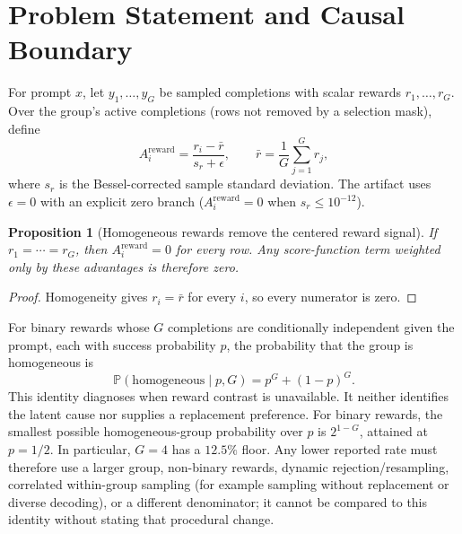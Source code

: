 \documentclass{article}
\newtheorem{proposition}{Proposition}
\newcommand{\Prob}{\mathbb{P}}
\begin{document}
\section{Problem Statement and Causal Boundary}

For prompt $x$, let $y_1,\ldots,y_G$ be sampled completions with scalar rewards
$r_1,\ldots,r_G$.  Over the group's active completions (rows not removed by a
selection mask), define
\begin{equation}
  A_i^{\mathrm{reward}}
  = \frac{r_i-\bar r}{s_r+\epsilon},
  \qquad
  \bar r=\frac{1}{G}\sum_{j=1}^G r_j,
\end{equation}
where $s_r$ is the Bessel-corrected sample standard deviation.  The artifact
uses $\epsilon=0$ with an explicit zero branch ($A_i^{\mathrm{reward}}=0$ when
$s_r\leq10^{-12}$).

\begin{proposition}[Homogeneous rewards remove the centered reward signal]
If $r_1=\cdots=r_G$, then $A_i^{\mathrm{reward}}=0$ for every row.  Any
score-function term weighted only by these advantages is therefore zero.
\end{proposition}

\begin{proof}
Homogeneity gives $r_i=\bar r$ for every $i$, so every numerator is zero.
\end{proof}

For binary rewards whose $G$ completions are conditionally independent given
the prompt, each with success probability $p$, the probability that the group
is homogeneous is
\begin{equation}
  \Prob(\text{homogeneous}\mid p,G)=p^G+(1-p)^G.
\end{equation}
This identity diagnoses when reward contrast is unavailable.  It neither
identifies the latent cause nor supplies a replacement preference.
For binary rewards, the smallest possible homogeneous-group probability over
$p$ is $2^{1-G}$, attained at $p=1/2$.  In particular, $G=4$ has a $12.5\%$
floor.  Any lower reported rate must therefore use a larger group, non-binary
rewards, dynamic rejection/resampling, correlated within-group sampling (for
example sampling without replacement or diverse decoding), or a different
denominator; it cannot be compared to this identity without stating that
procedural change.
\end{document}
